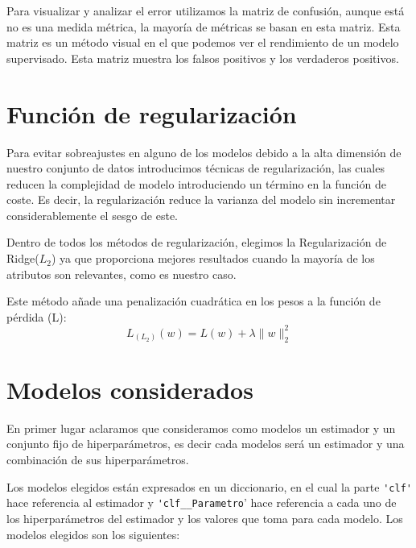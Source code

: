 \documentclass[size=a4, parskip=half, titlepage=false, toc=flat, toc=bib, 12pt]{scrartcl}
\begin{document}
Para visualizar y analizar el error utilizamos la matriz de confusión, aunque está no es una medida métrica, la mayoría de métricas se basan en esta matriz. Esta matriz es un método visual en el que podemos ver el rendimiento de un modelo supervisado. Esta matriz muestra los falsos positivos y los verdaderos positivos.

\section{Función de regularización}
Para evitar sobreajustes en alguno de los modelos debido a la alta dimensión de nuestro conjunto de datos introducimos técnicas de regularización, las cuales reducen la complejidad de modelo introduciendo un término en la función de coste. Es decir, la regularización reduce la varianza del modelo sin incrementar considerablemente el sesgo de este.

Dentro de todos los métodos de regularización, elegimos la Regularización de Ridge($L_2$) ya que proporciona mejores resultados cuando la mayoría de los atributos son relevantes, como es nuestro caso.

Este método añade una penalización cuadrática en los pesos a la función de pérdida (L):
$$L_{(L_2)}(w) = L(w) + \lambda \|w\|_2^2 $$

\section{Modelos considerados}
En primer lugar aclaramos que consideramos como modelos un estimador y un conjunto fijo de hiperparámetros, es decir cada modelos será un estimador y una combinación de sus hiperparámetros.

Los modelos elegidos están expresados en un diccionario, en el cual la parte \verb|'clf'| hace referencia al estimador y \verb|'clf__Parametro|' hace referencia a cada uno de los hiperparámetros del estimador y los valores que toma para cada modelo. Los modelos elegidos son los siguientes:
\end{document}
